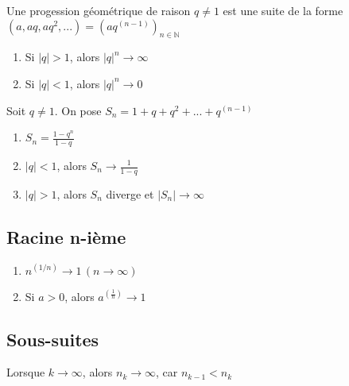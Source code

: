 \documentclass{article}
\begin{document}
\begin{definition}
    Une progession géométrique de raison $q \neq 1$ est une suite de la forme
    $(a, aq, aq^2, ...) = (aq^(n-1))_{n \in \mathbb{N}}$
\end{definition}

\begin{theorem}
    \begin{enumerate}
	\item Si $|q| >1$, alors $|q|^n \rightarrow \infty$
	\item Si $|q| <1$, alors $|q|^n \rightarrow 0$
    \end{enumerate}
\end{theorem}

\begin{theorem}
    Soit $q \neq 1$. On pose $S_n = 1 + q + q^2 + ... + q^(n-1)$
    \begin{enumerate}
	\item $S_n = \frac{1 - q^n}{1-q}$
	\item $|q|<1$, alors $S_n \rightarrow \frac{1}{1-q}$
	\item $|q|>1$, alors $S_n$ diverge et $|S_n| \rightarrow \infty$
    \end{enumerate}
\end{theorem}

\subsection{Racine n-ième}

\begin{theorem}
    \begin{enumerate}
	\item $n^(1/n) \rightarrow 1 \, (n \rightarrow \infty)$
	\item Si $a>0$, alors $a^(\frac{1}{n}) \rightarrow 1 $
    \end{enumerate}
\end{theorem}

\subsection{Sous-suites}

\begin{definition}
\end{definition}

\begin{remark}
    Lorsque $k \rightarrow \infty$, alors $n_k \rightarrow \infty$, car
    $n_{k-1} < n_k$
\end{remark}
\end{document}

